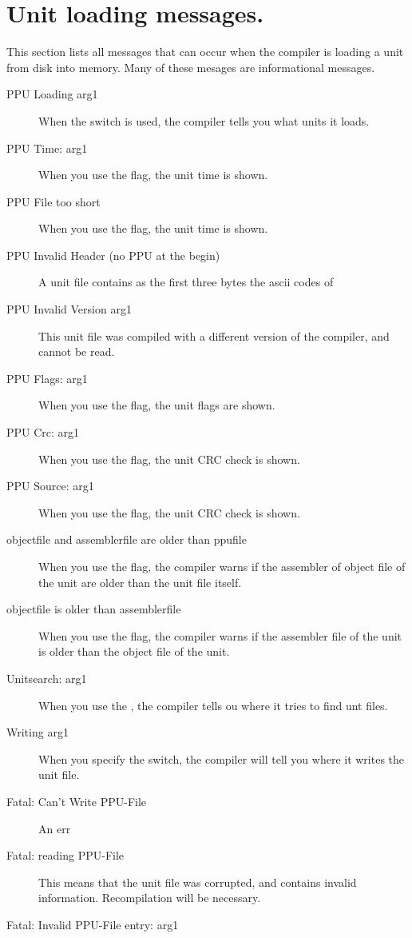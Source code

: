  \section{Unit loading messages.}
 This section lists all messages that can occur when the compiler is
 loading a unit from disk into memory. Many of these mesages are
 informational messages.
 \begin{description}
\item [PPU Loading arg1]
 When the  switch is used, the compiler tells you what units it
 loads.
\item [PPU Time: arg1]
 When you use the  flag, the unit time is shown.
\item [PPU File too short]
 When you use the  flag, the unit time is shown.
\item [PPU Invalid Header (no PPU at the begin)]
 A unit file contains as the first three bytes the ascii codes of 
\item [PPU Invalid Version arg1]
 This unit file was compiled with a different version of the compiler, and
 cannot be read.
\item [PPU Flags: arg1]
 When you use the  flag, the unit flags are shown.
\item [PPU Crc: arg1]
 When you use the  flag, the unit CRC check is shown.
\item [PPU Source: arg1]
 When you use the  flag, the unit CRC check is shown.
\item [objectfile and assemblerfile are older than ppufile]
 When you use the  flag, the compiler warns if the assembler of
 object file of the unit are older than the unit file itself.
\item [objectfile is older than assemblerfile]
 When you use the  flag, the compiler warns if the assembler 
 file of the unit is older than the object file of the unit.
\item [Unitsearch: arg1]
 When you use the , the compiler tells ou where it tries to find
 unt files.
\item [Writing arg1]
 When you specify the  switch, the compiler will tell you where it
 writes the unit file.
\item [Fatal: Can't Write PPU-File]
 An err
\item [Fatal: reading PPU-File]
 This means that the unit file was corrupted, and contains invalid
 information. Recompilation will be necessary.
\item [Fatal: Invalid PPU-File entry: arg1]

\end{description}
